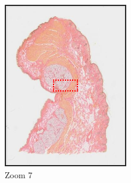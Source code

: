 \documentclass[a4paper,11pt]{report}
\numberwithin{figure}{chapter} %
\begin{document}
\begin{itemize}
\begin{figure}[H]
\begin{subfigure}[b]{0.3\textwidth}
            \includegraphics[width=\textwidth]{images/zooms5.png}
            \caption{Zoom 7}
            \end{subfigure}
            \begin{subfigure}[b]{0.3\textwidth}

\end{subfigure}
\end{figure}
\end{itemize}
\end{document}
